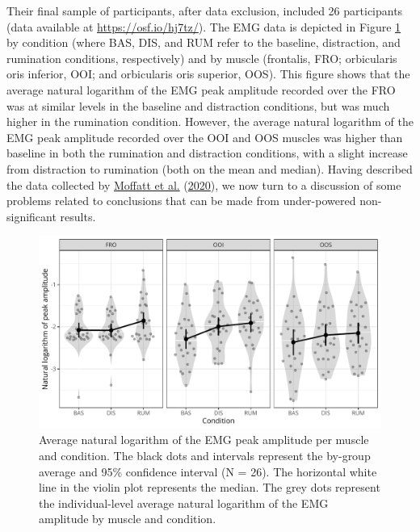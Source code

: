 \documentclass[
  english,
  man, donotrepeattitle,floatsintext]{apa6}
\begin{document}
Their final sample of participants, after data exclusion, included 26 participants (data available at \url{https://osf.io/hj7tz/}). The EMG data is depicted in Figure \ref{fig:general} by condition (where BAS, DIS, and RUM refer to the baseline, distraction, and rumination conditions, respectively) and by muscle (frontalis, FRO; orbicularis oris inferior, OOI; and orbicularis oris superior, OOS). This figure shows that the average natural logarithm of the EMG peak amplitude recorded over the FRO was at similar levels in the baseline and distraction conditions, but was much higher in the rumination condition. However, the average natural logarithm of the EMG peak amplitude recorded over the OOI and OOS muscles was higher than baseline in both the rumination and distraction conditions, with a slight increase from distraction to rumination (both on the mean and median). Having described the data collected by \protect\hyperlink{ref-moffatt_inner_2020}{Moffatt et al.} (\protect\hyperlink{ref-moffatt_inner_2020}{2020}), we now turn to a discussion of some problems related to conclusions that can be made from under-powered non-significant results.

\begin{figure}[!htb]

{\centering \includegraphics[width=1\linewidth]{manuscript_files/figure-latex/general-1} 

}

\caption{Average natural logarithm of the EMG peak amplitude per muscle and condition. The black dots and intervals represent the by-group average and 95\% confidence interval (N = 26). The horizontal white line in the violin plot represents the median. The grey dots represent the individual-level average natural logarithm of the EMG amplitude by muscle and condition.}\label{fig:general}
\end{figure}
\end{document}
